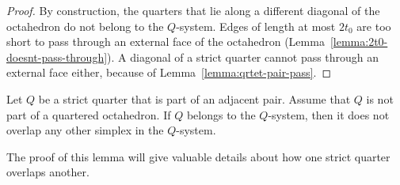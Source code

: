 \begin{proof} By construction, the quarters that lie along a
different diagonal of the octahedron do not belong to the
$Q$-system.  Edges of length at most $2t_0$ are too short to pass
through an external face of the octahedron
(Lemma~\ref{lemma:2t0-doesnt-pass-through}). A diagonal of a
strict quarter cannot pass through an external face either,
because of Lemma~\ref{lemma:qrtet-pair-pass}.
\end{proof}

\begin{lemma}\label{lemma:adj-over}
Let $Q$ be a strict quarter that is part of an adjacent pair.
Assume that $Q$ is not part of a quartered octahedron.  If $Q$
belongs to the $Q$-system, then it does not overlap any other
simplex in the $Q$-system.
\end{lemma}

The proof of this lemma will give valuable details about how one
strict quarter overlaps another.

